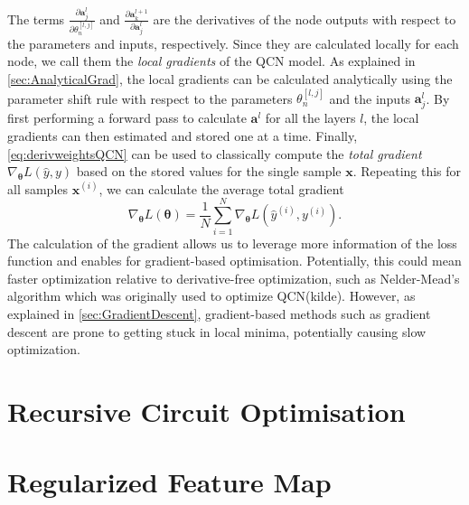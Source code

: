The terms $\frac{\partial \boldsymbol{a}^{l}_j}{\partial \theta^{[l,j]}_n}$ and $\frac{\partial \boldsymbol{a}^{l+1}_k}{\partial \boldsymbol{a}^{l}_j}$ are the derivatives of the node outputs with respect to the parameters and inputs, respectively. Since they are calculated locally for each node, we call them the \emph{local gradients} of the QCN model. As explained in \autoref{sec:AnalyticalGrad}, the local gradients can be calculated analytically using the parameter shift rule with respect to the parameters $\theta^{[l,j]}_n$ and the inputs $\boldsymbol{a}^{l}_j$. By first performing a forward pass to calculate $\boldsymbol{a}^{l}$ for all the layers $l$, the local gradients can then estimated and stored one at a time. Finally, \autoref{eq:derivweightsQCN} can be used to classically compute the \emph{total gradient} $\nabla_{\boldsymbol{\theta}} L(\hat{y},y)$ based on the stored values for the single sample $\boldsymbol{x}$. Repeating this for all samples $\boldsymbol{x}^{(i)}$, we can calculate the average total gradient \begin{equation}\label{eq:averageGradientQCN}
    \nabla_{\boldsymbol{\theta}} L(\boldsymbol{\theta}) = \frac{1}{N}\sum_{i=1}^N \nabla_{\boldsymbol{\theta}} L(\hat{y}^{(i)}, y^{(i)}).
\end{equation}  The calculation of the gradient allows us to leverage more information of the loss function and enables for gradient-based optimisation. Potentially, this could mean faster optimization relative to derivative-free optimization, such as Nelder-Mead's algorithm which was originally used to optimize QCN(kilde). However, as explained in \autoref{sec:GradientDescent}, gradient-based methods such as gradient descent are prone to getting stuck in local minima, potentially causing slow optimization.    

\section{Recursive Circuit Optimisation}\label{sec:RCO}

\section{Regularized Feature Map}\label{sec:RCO}


